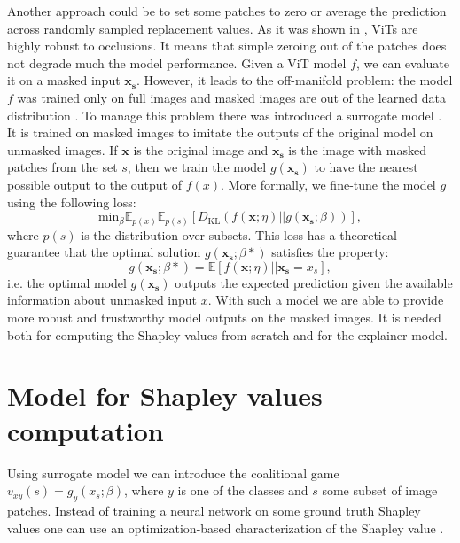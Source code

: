 \documentclass[magisterska,en]{pracamgr}
\begin{document}
Another approach could be to set some patches to zero or average the prediction across randomly sampled replacement values. As it was shown in \cite{DBLP:conf/nips/NaseerRKHKY21}, ViTs are highly robust to occlusions. It means that simple zeroing out of the patches does not degrade much the model performance.  Given a ViT model $f$, we can evaluate it on a masked input $\mathbf{x_s}$. However, it leads to the off-manifold problem: the model $f$ was trained only on full images and masked images are out of the learned data distribution \cite{DBLP:conf/aistats/TaufiqBM23}.  To manage this problem there was introduced a surrogate model \cite{DBLP:conf/iclr/FryeMBCSF21}. It is trained on masked images to imitate the outputs of the original model on unmasked images. If $\mathbf{x}$ is the original image and $\mathbf{x_s}$ is the image with masked patches from the set $s$, then we train the model $g(\mathbf{x_s})$ to have the nearest possible output to the output of $f(x)$. More formally, we fine-tune the model $g$ using the following loss:
\begin{equation*}
    \textrm{min}_{\beta} \mathbb{E}_{p(x)} \mathbb{E}_{p(s)} \left[D_{\textrm{KL}} \left(f(\mathbf{x};\eta) || g(\mathbf{x_s};\beta)\right)\right],
\end{equation*}
where $p(s)$ is the distribution over subsets. This loss has a theoretical guarantee that the optimal solution $g(\mathbf{x_s};\beta*)$ satisfies the property:
\begin{equation*}
    g(\mathbf{x_s};\beta*) = \mathbb{E}\left[f(\mathbf{x};\eta) || \mathbf{x_s}=x_s \right],
\end{equation*}
i.e. the optimal model $g(\mathbf{x_s})$ outputs the expected prediction given the available information about unmasked input $x$. With such a model we are able to provide more robust and trustworthy model outputs on the masked images. It is needed both for computing the Shapley values from scratch and for the explainer model.

\section{Model for Shapley values computation}\label{s:model}
Using surrogate model we can introduce the coalitional game $v_{xy}(s) = g_y(x_s;\beta)$, where $y$ is one of the classes and $s$ some subset of image patches. Instead of training a neural network on some ground truth Shapley values one can use an optimization-based characterization of the Shapley value  \cite{Characterization}.
\end{document}
